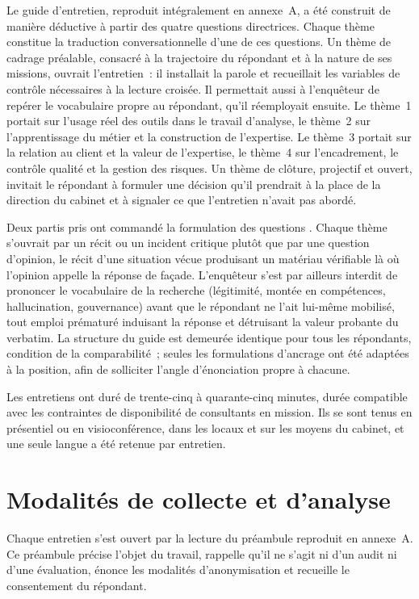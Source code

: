 Le guide d'entretien, reproduit intégralement en annexe~A, a été construit de manière
déductive à partir des quatre questions directrices. Chaque thème constitue la
traduction conversationnelle d'une de ces questions. Un thème de cadrage préalable,
consacré à la trajectoire du répondant et à la nature de ses missions, ouvrait
l'entretien~: il installait la parole et recueillait les variables de contrôle
nécessaires à la lecture croisée. Il permettait aussi à l'enquêteur de repérer le
vocabulaire propre au répondant, qu'il réemployait ensuite. Le thème~1 portait sur l'usage réel des outils
dans le travail d'analyse, le thème~2 sur l'apprentissage du métier et la construction
de l'expertise. Le thème~3 portait sur la relation au client et la valeur de
l'expertise, le thème~4 sur l'encadrement, le contrôle qualité et la gestion des
risques. Un thème de
clôture, projectif et ouvert, invitait le répondant à formuler une décision qu'il
prendrait à la place de la direction du cabinet et à signaler ce que l'entretien
n'avait pas abordé.

Deux partis pris ont commandé la formulation des questions \cite{blanchet2007}. Chaque
thème s'ouvrait par un récit ou un incident critique plutôt que par une question
d'opinion, le récit d'une situation vécue produisant un matériau vérifiable là où
l'opinion appelle la réponse de façade. L'enquêteur s'est par ailleurs interdit de
prononcer le vocabulaire de la recherche (légitimité, montée en compétences,
hallucination, gouvernance) avant que le répondant ne l'ait lui-même mobilisé, tout
emploi prématuré induisant la réponse et détruisant la valeur probante du verbatim. La
structure du guide est demeurée identique pour tous les répondants, condition de la
comparabilité~; seules les formulations d'ancrage ont été adaptées à la position, afin
de solliciter l'angle d'énonciation propre à chacune.

Les entretiens ont duré de trente-cinq à quarante-cinq minutes, durée compatible avec
les contraintes de disponibilité de consultants en mission. Ils se sont tenus en
présentiel ou en visioconférence, dans les locaux et sur les moyens du cabinet, et une
seule langue a été retenue par entretien.

\section{Modalités de collecte et d'analyse}

Chaque entretien s'est ouvert par la lecture du préambule reproduit en annexe~A. Ce
préambule précise l'objet du travail, rappelle qu'il ne s'agit ni d'un audit ni d'une
évaluation, énonce les modalités d'anonymisation et recueille le consentement du
répondant.

